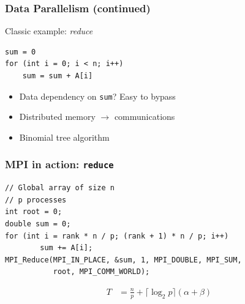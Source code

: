\documentclass[xcolor={rgb,x11names,svgnames},rgb,x11names,svgnames]{beamer}
\begin{document}
\begin{frame}[fragile=singleslide]
\frametitle{Data Parallelism (continued)}


\begin{block}{Classic example: \emph{reduce}}
\begin{verbatim}
sum = 0
for (int i = 0; i < n; i++)
    sum = sum + A[i]
\end{verbatim}
\end{block}

\bigskip

\begin{itemize}
\item Data dependency on \texttt{sum}? Easy to bypass
\item Distributed memory $\rightarrow$ communications
\item Binomial tree algorithm
\end{itemize}
\end{frame}


\begin{frame}[fragile=singleslide]
  \frametitle{MPI in action: \texttt{reduce}}

  
  \bigskip

\begin{verbatim}
// Global array of size n
// p processes
int root = 0;
double sum = 0;
for (int i = rank * n / p; (rank + 1) * n / p; i++)
        sum += A[i];
MPI_Reduce(MPI_IN_PLACE, &sum, 1, MPI_DOUBLE, MPI_SUM,
           root, MPI_COMM_WORLD);
\end{verbatim}        

\begin{align*}
  T &= \frac{n}{p} + \lceil \log_2 p \rceil (\alpha + \beta)
\end{align*}
\end{frame}
\end{document}

